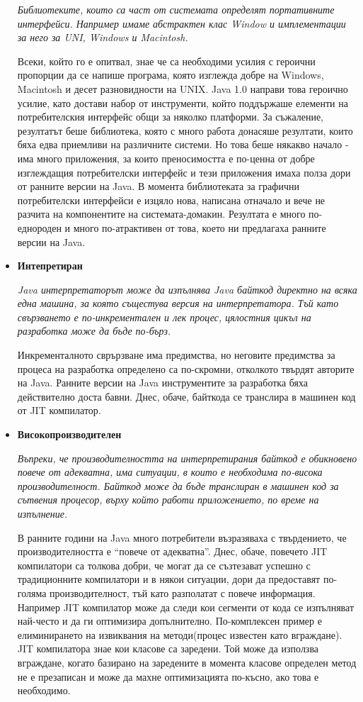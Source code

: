 \begin{itemize}
    \emph{Библиотеките, които са част от системата определят портативните
    интерфейси. Например имаме абстрактен клас Window и имплементации за
    него за UNI, Windows и Macintosh.}

    Всеки, който го е опитвал, знае че са необходими усилия с героични
    пропорции да се напише програма, която изглежда добре на Windows,
    Macintosh и десет разновидности на UNIX. Java 1.0 направи това
    героично усилие, като достави набор от инструменти, който поддържаше
    елементи на потребителския интерфейс общи за няколко платформи. За
    съжаление, резултатът беше библиотека, която с много работа донасяше
    резултати, които бяха едва приемливи на различните системи. Но това
    беше някакво начало - има много приложения, за които преносимостта е
    по-ценна от добре изглеждащия потребителски интерфейс и тези
    приложения имаха полза дори от ранните версии на Java. В момента
    библиотеката за графични потребителски интерфейси е изцяло нова,
    написана отначало и вече не разчита на компонентите на
    системата-домакин. Резултата е много по-еднороден и много
    по-атрактивен от това, което ни предлагаха ранните версии на Java. 

  \item \textbf{Интепретиран}

    \emph{Java интерпретаторът може да изпълнява Java байткод директно на всяка
    една машина, за която същестува версия на интерпретатора. Тъй като
    свързването е по-инкрементален и лек процес, цялостния цикъл на
    разработка може да бъде по-бърз.}

    Инкременталното сврързване има предимства, но неговите предимства за
    процеса на разработка определено са по-скромни, отколкото твърдят
    авторите на Java. Ранните версии на Java инструментите за разработка
    бяха действително доста бавни. Днес, обаче, байткода се транслира в
    машинен код от JIT компилатор.
  \item \textbf{Високопроизводителен}

    \emph{Въпреки, че производителността на интерпретирания байткод е
    обикновено повече от адекватна, има ситуации, в които е необходима
    по-висока производителност. Байткод може да бъде транслиран в
    машинен код за сътвения процесор, върху който работи приложението,
    по време на изпълнение.}

    В ранните години на Java много потребители възразяваха с
    твърдението, че производителността е "`повече от
    адекватна"'. Днес, обаче, повечето JIT компилатори са толкова
    добри, че могат да се съзтезават успешно с традиционните
    компилатори и в някои ситуации, дори да предоставят по-голяма
    производителност, тъй като разполатат с повече
    информация. Например JIT компилатор може да следи кои сегменти от
    кода се изпълняват най-често и да ги оптимизира
    допълнително. По-комплексен пример е елиминирането на извиквания
    на методи(процес известен като вграждане). JIT компилатора знае
    кои класове са заредени. Той може да използва вграждане, когато
    базирано на заредените в момента класове определен метод не е
    презаписан и може да махне оптимизацията по-късно, ако това е необходимо.  



\end{itemize}
